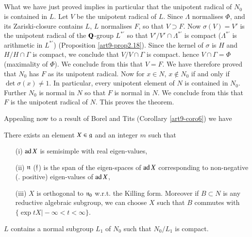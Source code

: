 \setcounter{subsection}{44}
\subsection{}\label{art9-subsec2.45}
What we have just proved implies in particular that the unipotent radical of $N_0$ is contained in $L$. Let $V$ be the unipotent radical of $L$. Since $\Lambda$ normalises $\Phi$, and its  Zariski-closure contains $L$, $L$ normalises $F$, so that $V \supset F$. Now $\sigma (V) = V'$ is the unipotent radical of the $\mathbf{Q}$-group $L^{\ast'}$ so that $V'/V' \cap \Lambda^{\ast'}$ is compact ($\Lambda^{\ast'}$ is arithmetic in $L^{\ast'}$) (Proposition \ref{art9-prop2.18}). Since the kernel of $\sigma$ is $H$ and $H/H \cap \Gamma$ is compact, we conclude that $V/V \cap \Gamma$ is compact. hence $V \cap \Gamma = \Phi$ (maximality of $\Phi$). We conclude from this that $V = F$. We have therefore proved that $N_0$ has $F$ as its unipotent radical. Now for $x \in N$, $x \not\in N_0$ if and only if $\det \sigma (x) \neq 1$. In particular, every unipotent element of $N$ is contained in $N_0$. Further $N_0$ is normal in $N$ so that $F$ is normal in $N$. We conclude from this that $F$ is the unipotent radical of $N$. This proves the theorem.

Appealing now to a result of Borel and Tits (Corollary \ref{art9-coro6}) we have 

\setcounter{corollary}{45}
\begin{corollary}\label{art9-subsec2.46}
There exists an element $X \in \mathfrak{g}$ and an integer $m$ such that 
\begin{itemize}
\item[(i)] $\operatorname{ad} X$ is semisimple with real eigen-values,

\item[(ii)] $\mathfrak{n}$ (\resp $\mathfrak{f}$) is the span of the eigen-spaces of $\operatorname{ad} X$ corresponding to non-negative (\resp. positive) eigen-values of $\operatorname{ad} X$,

\item[(iii)] $X$ is orthogonal to $\mathfrak{n}_0$ w.r.t. the Killing form. Moreover if $B \subset N$ is any reductive algebraic subgroup, we can choose $X$ such that $B$ commutes with $\{\exp t X \big| - \infty < t < \infty \}$.
\end{itemize}
\end{corollary}

\begin{corollary}\label{art9-coro2.47}
$L$ contains a normal subgroup $L_1$ of $N_0$ such that $N_0/ L_1$ is compact.
\end{corollary}

